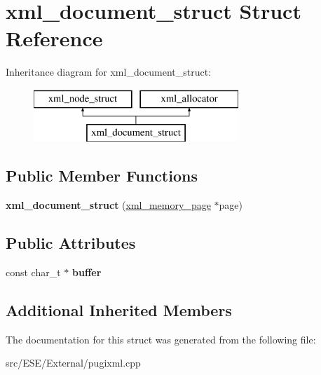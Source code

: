 \hypertarget{structxml__document__struct}{\section{xml\-\_\-document\-\_\-struct Struct Reference}
\label{structxml__document__struct}
}
Inheritance diagram for xml\-\_\-document\-\_\-struct\-:\begin{figure}[H]
\begin{center}
\leavevmode
\includegraphics[height=2.000000cm]{structxml__document__struct}
\end{center}
\end{figure}
\subsection*{Public Member Functions}
\begin{DoxyCompactItemize}
\item 
\hypertarget{structxml__document__struct_aea3482436c20abd98ca063c3bd5dcfba}{{\bfseries xml\-\_\-document\-\_\-struct} (\hyperlink{structxml__memory__page}{xml\-\_\-memory\-\_\-page} $\ast$page)}\label{structxml__document__struct_aea3482436c20abd98ca063c3bd5dcfba}

\end{DoxyCompactItemize}
\subsection*{Public Attributes}
\begin{DoxyCompactItemize}
\item 
\hypertarget{structxml__document__struct_a120451f29b8cc2a82a3ecc926449ea0e}{const char\-\_\-t $\ast$ {\bfseries buffer}}\label{structxml__document__struct_a120451f29b8cc2a82a3ecc926449ea0e}

\end{DoxyCompactItemize}
\subsection*{Additional Inherited Members}


The documentation for this struct was generated from the following file\-:\begin{DoxyCompactItemize}
\item 
src/\-E\-S\-E/\-External/pugixml.\-cpp\end{DoxyCompactItemize}
